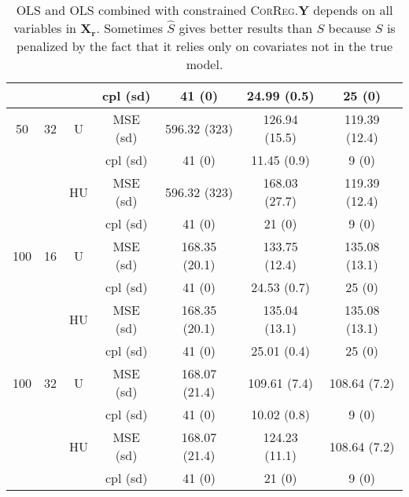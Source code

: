 \documentclass[11pt,a4paper]{article}
\begin{document}
\begin{table}[h!]
\begin{tabular}{|c|c|c|c|c|c|c|}
& & & cpl (sd) & 41 (0) & 24.99 (0.5) & 25 (0) \\
\hline %
50 & 32 & U&MSE (sd) & 596.32 (323) & 126.94 (15.5) & 119.39 (12.4) \\
& & & cpl (sd) & 41 (0) & 11.45 (0.9) & 9 (0) \\
 &  &HU &MSE (sd) & 596.32 (323) & 168.03 (27.7) & 119.39 (12.4) \\
& & &cpl (sd) & 41 (0) & 21 (0) & 9 (0) \\
\hline
\hline %
100 & 16 & U&  MSE (sd) & 168.35 (20.1) & 133.75 (12.4) & 135.08 (13.1) \\
& & & cpl (sd) & 41 (0) & 24.53 (0.7) & 25 (0) \\
 &  &HU &  MSE (sd) & 168.35 (20.1) & 135.04 (13.1) & 135.08 (13.1) \\
& & & cpl (sd) & 41 (0) & 25.01 (0.4) & 25 (0) \\
\hline %
100 & 32 & U&  MSE (sd) & 168.07 (21.4) & 109.61 (7.4) & 108.64 (7.2) \\
& & &  cpl (sd) & 41 (0) & 10.02 (0.8) & 9 (0) \\
 &  &HU & MSE (sd) & 168.07 (21.4) & 124.23 (11.1) & 108.64 (7.2) \\
& & & cpl (sd) & 41 (0) & 21 (0) & 9 (0) \\
\hline
\end{tabular} 
\caption{OLS and OLS combined with constrained \textsc{CorReg}.$\boldsymbol{Y}$  depends on all variables in $\boldsymbol{X_r}$. Sometimes $\hat{S}$ gives better results than $S$ because $S$ is penalized by the fact that it relies only on covariates not in the true model. } \label{YX2linOLS}
\end{table}
\end{document}

